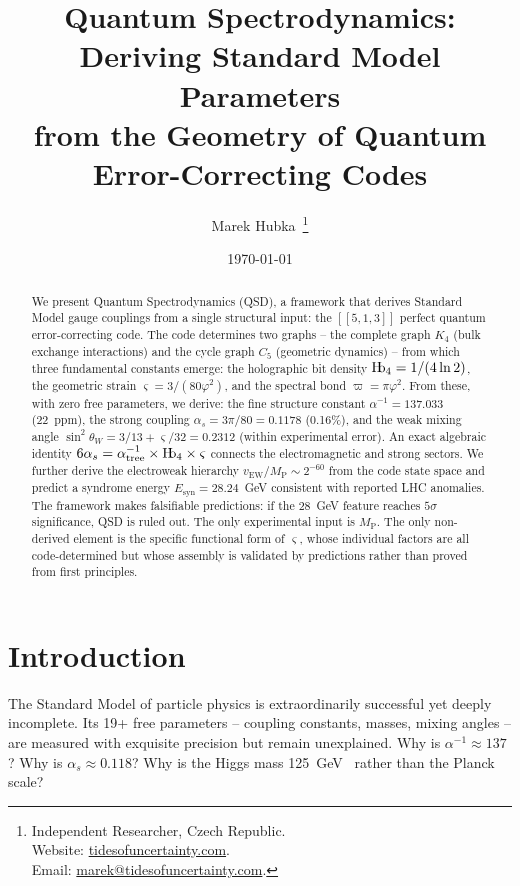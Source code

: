 \documentclass[11pt,a4paper]{article}
\title{
  \textbf{Quantum Spectrodynamics}:\\[0.5em]
  \Large Deriving Standard Model Parameters\\from the Geometry of Quantum Error-Correcting Codes\\[1em]
}
\author{
  Marek Hubka\, \orcidlink{0009-0003-2476-9017}
  \thanks{
    Independent Researcher, Czech Republic.\\
    Website: \href{http://www.tidesofuncertainty.com}{tidesofuncertainty.com}.\\
    Email: \href{mailto:marek@tidesofuncertainty.com}{marek@tidesofuncertainty.com}.
  }
}
\date{\today}
\theoremstyle{definition}
\newcommand{\Hb}{\textnormal{H\kern-0.3em b}}
\newcommand{\Hbfour}{\Hb_4}
\newcommand{\strain}{\varsigma}
\newcommand{\specbond}{\varpi}
\newcommand{\Esyn}{E_{\text{syn}}}
\newcommand{\Mpl}{M_{\mathrm{P}}}
\begin{document}
\maketitle

\begin{abstract}
\noindent We present Quantum Spectrodynamics (QSD), a framework that derives Standard Model gauge couplings from a single structural input: the $[[5,1,3]]$ perfect quantum error-correcting code. The code determines two graphs -- the complete graph $K_4$ (bulk exchange interactions) and the cycle graph $C_5$ (geometric dynamics) -- from which three fundamental constants emerge: the holographic bit density $\Hbfour = 1/(4\ln 2)$, the geometric strain $\strain = 3/(80\varphi^2)$, and the spectral bond $\specbond = \pi\varphi^2$. From these, with zero free parameters, we derive:
the fine structure constant $\alpha^{-1} = 137.033$ (22~ppm),
the strong coupling $\alpha_s = 3\pi/80 = 0.1178$ (0.16\%),
and the weak mixing angle $\sin^2\theta_W = 3/13 + \strain/32 = 0.2312$ (within experimental error).
An exact algebraic identity $6\alpha_s = \alpha^{-1}_{\text{tree}} \times \Hbfour \times \strain$ connects the electromagnetic and strong sectors. We further derive the electroweak hierarchy $v_{\text{EW}}/\Mpl \sim 2^{-60}$ from the code state space and predict a syndrome energy $\Esyn = 28.24$~GeV consistent with reported LHC anomalies. The framework makes falsifiable predictions: if the 28~GeV feature reaches $5\sigma$ significance, QSD is ruled out.
The only experimental input is $\Mpl$. The only non-derived element is the specific functional form of $\strain$, whose individual factors are all code-determined but whose assembly is validated by predictions rather than proved from first principles.
\end{abstract}

\tableofcontents
\newpage

\section{Introduction}
\label{sec:intro}

The Standard Model of particle physics is extraordinarily successful yet deeply incomplete. Its 19+ free parameters -- coupling constants, masses, mixing angles -- are measured with exquisite precision but remain unexplained. Why is $\alpha^{-1} \approx 137$? Why is $\alpha_s \approx 0.118$? Why is the Higgs mass 125~GeV~\cite{ATLASHiggs2012,CMSHiggs2012} rather than the Planck scale?
\end{document}
